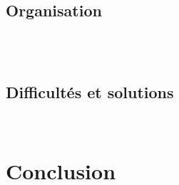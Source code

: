 \documentclass[a4paper,11pt]{article}
\begin{document}
	    
	    
	    ~\\
	    ~\\	    
	    \subsection{ Organisation }
	    
	    
	    ~\\
	    ~\\	    
	    \subsection{ Difficultés et solutions} \label{ret}
	    
	    
	    
	    
	    ~\\
	     
			    
\section{ Conclusion }




		   
		   
\appendix %
		   

		   
\newpage		   
~\\ 		   			    
\end{document}
